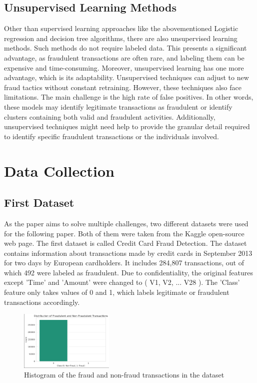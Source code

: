 \documentclass[a4paper,twocolumn,12pt]{article}
\begin{document}
\subsection{Unsupervised Learning Methods}

Other than supervised learning approaches like the abovementioned Logistic regression and decision tree algorithms, there are also unsupervised learning methods. Such methods do not require labeled data. This presents a significant advantage, as fraudulent transactions are often rare, and labeling them can be expensive and time-consuming.\cite{carcillo2021combining}  Moreover, unsupervised learning has one more advantage, which is its adaptability. Unsupervised techniques can adjust to new fraud tactics without constant retraining.\cite{kazeemfraud}
However, these techniques also face limitations. The main challenge is the high rate of false positives. In other words, these models may identify legitimate transactions as fraudulent or identify clusters containing both valid and fraudulent activities. Additionally, unsupervised techniques might need help to provide the granular detail required to identify specific fraudulent transactions or the individuals involved.\cite{kazeemfraud}




\section{Data Collection}

\subsection{First Dataset}

As the paper aims to solve multiple challenges, two different datasets were used for the following paper. Both of them were taken from the Kaggle open-source web page. The first dataset is called Credit Card Fraud Detection. The dataset contains information about transactions made by credit cards in September 2013 for two days by European cardholders. It includes 284,807 transactions, out of which 492 were labeled as fraudulent. Due to confidentiality, the original features except 'Time' and 'Amount' were changed to ( V1, V2, ... V28 ). The 'Class' feature only takes values of 0 and 1, which labels legitimate or fraudulent transactions accordingly.
\begin{figure}[h]
\centering
\includegraphics[width = 0.4\textwidth]{Figuras/Histogram of fraud.png} 
\caption{Histogram of the fraud and non-fraud transactions in the dataset}
\end{figure}
\end{document}
